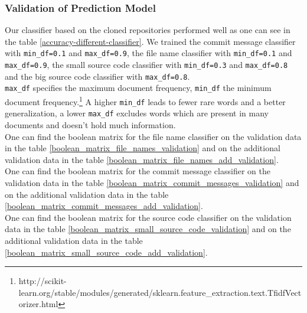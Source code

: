 \documentclass[%
a4paper,
DIV12,
2.5headlines,
bigheadings,
titlepage,
openbib,
]{scrartcl}
\begin{document}

\subsubsection{Validation of Prediction
Model}\label{validation-of-prediction-model-2}

Our classifier based on the cloned repositories performed well as one can see in the table \ref{accuracy-different-classifier}.
We trained the commit message classifier with \texttt{min\_df=0.1} and \texttt{max\_df=0.9}, the file name classifier with \texttt{min\_df=0.1} and \texttt{max\_df=0.9}, the small source code classifier with \texttt{min\_df=0.3} and \texttt{max\_df=0.8} and the big source code classifier with \texttt{max\_df=0.8}.\\
\texttt{max\_df} specifies the maximum document frequency, \texttt{min\_df} the minimum document frequency.\footnote{http://scikit-learn.org/stable/modules/generated/sklearn.feature\_extraction.text.TfidfVectorizer.html}
A higher \texttt{min\_df} leads to fewer rare words and a better generalization, a lower \texttt{max\_df} excludes words which are present in many documents and doesn't hold much information.\\

One can find the boolean matrix for the file name classifier on the validation data in the table \ref{boolean_matrix_file_names_validation} and on the additional validation data in the table \ref{boolean_matrix_file_names_add_validation}.\\
One can find the boolean matrix for the commit message classifier on the validation data in the table \ref{boolean_matrix_commit_messages_validation} and on the additional validation data in the table \ref{boolean_matrix_commit_messages_add_validation}.\\
One can find the boolean matrix for the source code classifier on the validation data in the table \ref{boolean_matrix_small_source_code_validation} and on the additional validation data in the table \ref{boolean_matrix_small_source_code_add_validation}.\\
\end{document}
